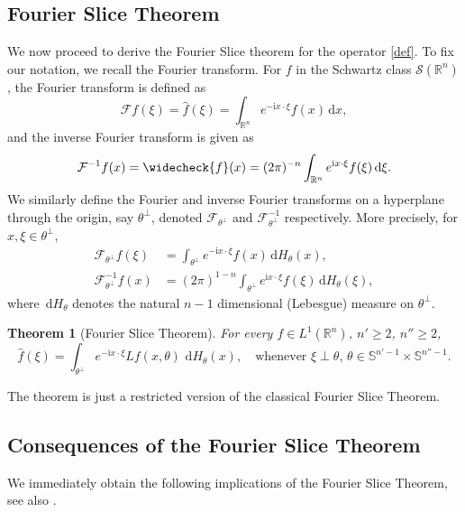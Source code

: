 \documentclass[11pt]{amsart}
\newtheorem{theorem}{Theorem}[section]
\theoremstyle{definition}
\theoremstyle{remark}
\numberwithin{equation}{section}
\newcommand{\Rn}{\mathbb{R}^n}
\newcommand{\Sc}{\mathcal{S}}
\renewcommand{\d}{\,\mathrm{d}}
\renewcommand{\sb}{\mathbb{S}}
\newcommand{\Fc}{\mathcal{F}}
\newcommand{\I}{\mathrm{i}}
\begin{document}
\subsection{Fourier Slice Theorem} We now proceed to derive the Fourier Slice theorem for the operator \eqref{def}. To fix our notation, we recall the Fourier transform. For $f$  in the Schwartz class $\Sc(\Rn)$, the Fourier transform is defined as 
\begin{equation}
    \Fc f (\xi) = \widehat{f}(\xi) = \int_{\Rn} e^{-\I x \cdot \xi} f(x) \d x,
\end{equation}
and the inverse Fourier transform is given as
\begin{equation}
    \Fc^{-1} f (x) = \widecheck{f} (x) = (2\pi)^{-n} \int_{\Rn} e^{\I x \cdot \xi} f(\xi) \d \xi.
\end{equation}
We similarly define the Fourier and inverse Fourier transforms on a hyperplane through the origin, say $\theta^\perp$, denoted $\Fc_{\theta^\perp}$ and $\Fc^{-1}_{\theta^\perp}$ respectively. More precisely, for $x,\xi \in \theta^\perp$,
\begin{equation}
    \begin{split}
        \Fc_{\theta^\perp} f (\xi) &= \int_{\theta^\perp} e^{-\I x \cdot \xi} f(x) \d H_\theta(x), \\
        \Fc^{-1}_{\theta^\perp} f (x) &= (2\pi)^{1-n} \int_{\theta^\perp} e^{\I x \cdot \xi} f(\xi) \d H_\theta(\xi),
    \end{split}
\end{equation}
where $\d H_\theta$ denotes the natural $n-1$ dimensional (Lebesgue) measure on $\theta^\perp$. 

\begin{theorem}[Fourier Slice Theorem]   \label{thm_FS}
    For every $f \in L^1 (\Rn)$, $n'\ge2$, $n''\ge2$,
    \begin{equation}
       \hat f(\xi) = \int_{\theta^\perp } e^{-\I x\cdot\xi} Lf(x,\theta)\,\d H_\theta(x), \quad \text{whenever  $\xi\perp \theta$, $\theta\in  \sb^{n'-1}\times \sb^{n''-1} $}.
    \end{equation}
\end{theorem}
The theorem is just a restricted version of the classical Fourier Slice Theorem.
 

\subsection{Consequences of the Fourier Slice Theorem} We immediately obtain the following implications of the Fourier Slice Theorem, see also \cite{Ilmavirta-pseudo}.
\end{document}
